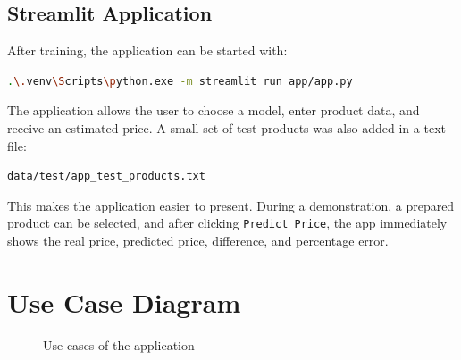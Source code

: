 \documentclass[12pt,a4paper]{article}
\begin{document}
\subsection{Streamlit Application}

After training, the application can be started with:

\begin{lstlisting}[language=bash, caption={Starting the Streamlit app}]
.\.venv\Scripts\python.exe -m streamlit run app/app.py
\end{lstlisting}

The application allows the user to choose a model, enter product data, and receive an estimated price. A small set of test products was also added in a text file:

\begin{lstlisting}[language=bash, caption={File with test products}]
data/test/app_test_products.txt
\end{lstlisting}

This makes the application easier to present. During a demonstration, a prepared product can be selected, and after clicking \texttt{Predict Price}, the app immediately shows the real price, predicted price, difference, and percentage error.

\section{Use Case Diagram}

\begin{figure}[H]
\centering
{}
\caption{Use cases of the application}
\label{fig:usecase}
\end{figure}
\end{document}
